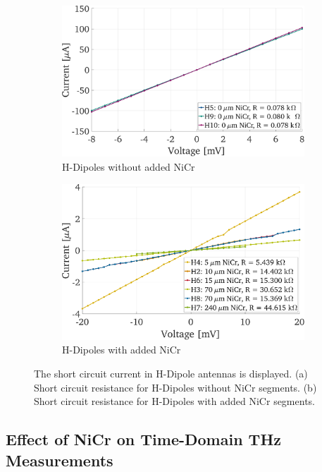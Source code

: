 \begin{figure}[!]
    \centering
    \begin{subfigure}[b]{0.49\textwidth}
        \centering
        \includegraphics[height=0.6\textwidth]{figures/IV_v3/sc_h5_h9_h10.pdf}
        \caption{\centering
        H-Dipoles without added NiCr}
        \label{sc_wo_Nicr}
    \end{subfigure}
    \hfill
    \begin{subfigure}[b]{0.49\textwidth}
        \centering
        \includegraphics[height=0.6\textwidth]{figures/IV_v3/sc_h_dipoles_nicr.pdf}
        \caption{\centering
        H-Dipoles with added NiCr}
        \label{sc_w_NiCr}
    \end{subfigure}
    \caption{The short circuit current in H-Dipole antennas is displayed. (a) Short circuit resistance for H-Dipoles without NiCr segments. (b) Short circuit resistance for H-Dipoles with added NiCr segments.}
    \label{iv_sc}
\end{figure}

\subsection{Effect of NiCr on Time-Domain THz Measurements}


